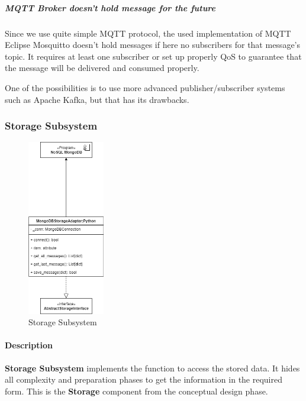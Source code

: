 \hypertarget{mqtt-broker-doesnt-hold-message-for-the-future}{%
\subparagraph{MQTT Broker doesn't hold message for the
future}\label{mqtt-broker-doesnt-hold-message-for-the-future}}

Since we use quite simple MQTT protocol, the used implementation of MQTT
Eclipse Mosquitto doesn't hold messages if here no subscribers for that
message's topic. It requires at least one subscriber or set up properly
QoS to guarantee that the message will be delivered and consumed
properly.

One of the possibilities is to use more advanced publisher/subscriber
systems such as Apache Kafka, but that has its drawbacks.

\hypertarget{storage-subsystem}{%
\subsubsection{Storage Subsystem}\label{storage-subsystem}}

\begin{figure}
\centering
\includegraphics[width=0.3\textwidth,height=\textheight]{schemes/classes/ClassDiagram-storage_subsystem.png}
\caption{Storage Subsystem}
\end{figure}

\hypertarget{description-1}{%
\paragraph{Description}\label{description-1}}

\textbf{Storage Subsystem} implements the function to access the stored
data. It hides all complexity and preparation phases to get the
information in the required form. This is the \textbf{Storage} component
from the conceptual design phase.

